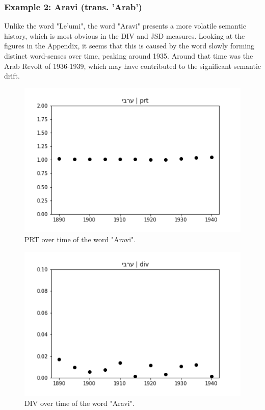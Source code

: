 \documentclass[10pt, a4paper]{article}
\begin{document}
\subsubsection{Example 2: Aravi (trans. 'Arab')}
Unlike the word "Le'umi", the word "Aravi" presents a more volatile semantic history, which is most obvious in the DIV and JSD measures. Looking at the figures in the Appendix, it seems that this is caused by the word slowly forming distinct word-senses over time, peaking around 1935. Around that time was the Arab Revolt of 1936-1939, which may have contributed to the significant semantic drift.
\begin{figure}[!h]
\begin{center}
\includegraphics[scale=0.5]{LREC_PAPER/aravi/ערבי_prt.png}
\caption{PRT over time of the word "Aravi".}
\label{fig.5}
\end{center}
\end{figure}

\begin{figure}[!h]
\begin{center}
\includegraphics[scale=0.5]{LREC_PAPER/aravi/ערבי_div.png}
\caption{DIV over time of the word "Aravi".}
\label{fig.6}
\end{center}
\end{figure}
\end{document}
